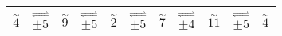 \documentclass{standalone}
\begin{document}
     \begin{tabular}{||c|c|c|c|c|c|c|c|c|c|c||} 
     \hline
      $\stackrel{\sim}{4}$ &  $\stackrel{\rightleftharpoons}{\pm5}$ & $\stackrel{\sim}{9}$  & $\stackrel{\rightleftharpoons}{\pm5}$ & $\stackrel{\sim}{2}$ & $\stackrel{\rightleftharpoons}{\pm5}$ & $\stackrel{\sim}{7}$ & $\stackrel{\rightleftharpoons}{\pm4}$ & $\stackrel{\sim}{11}$ & $\stackrel{\rightleftharpoons}{\pm5}$ & $\stackrel{\sim}{4}$  \\
     \hline 
  \end{tabular}
\end{document}
